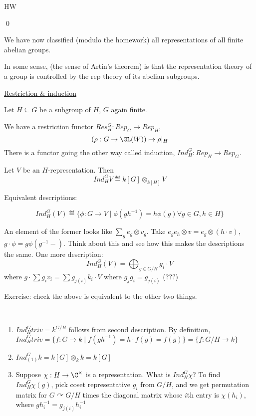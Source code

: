 \documentclass[x11names,reqno,14pt]{extarticle}
\begin{document}
\proof

HW

\qed

We have now classified (modulo the homework) all representations of all finite abelian groups. 

In some sense, (the sense of Artin's theorem) is that the representation theory of a group is controlled by the rep theory of its abelian subgroups. 

\underline{Restriction \& induction}

Let $H \subseteq G$ be a subgroup of $H$, $G$ again finite. 

We have a restriction functor $Res_H^G: Rep_G\to Rep_H$, 
\[
(\rho:G\to\GL(W)) \mapsto \rho|_H
\]
There is a functor going the other way called induction, $Ind_H^G:Rep_H\to Rep_G$. 


Let $V$ be an $H$-representation. Then 
\[
Ind_H^GV \eqdef k[G]\otimes_{k[H]}V
\]

Equivalent descriptions: 

\[
Ind_H^G(V) \eqdef \{\phi:G\to V \mid \phi(gh^{-1}) = h\phi(g)\forall g \in G, h \in H\}
\]

An element of the former looks like $\sum_g e_g\otimes v_g$. Take $e_ge_h\otimes v = e_g\otimes (h\cdot v)$, $g\cdot \phi = g\phi(g^{-1}-)$. Think about this and see how this makes the descriptions the same. One more description: 
\[
Ind_H^G(V) = \bigoplus_{g\in G/H}g_i\cdot V
\]
where $g\cdot \sum g_iv_i = \sum g_{j(i)}k_i \cdot V $ where $g_jg_i = g_{j(i)}$ (???)

Exercise: check the above is equivalent to the other two things. 

\exm
\,
\begin{enumerate}

\item $Ind_H^G triv = k^{G/H}$ follows from second description. By definition, $Ind_H^Gtriv = \{f:G\to k\mid f(gh^{-1}) = h\cdot f(g) = f(g)\} = \{f:G/H\to k\}$

\item $Ind_{(1)}^Gk = k[G] \otimes_kk = k[G]$

\item Suppose $\chi:H\to\C^\times$ is a representation. What is $Ind_H^G\chi$? To find $Ind_H^G\chi(g)$, pick coset representative $g_i$ from $G/H$, and we get permutation matrix for $G\curvearrowright G/H$ times the diagonal matrix whose $i$th entry is $\chi(h_i)$, where $gh_i^{-1} = g_{j(i)}h_i^{-1}$
\end{enumerate}
\end{document}
